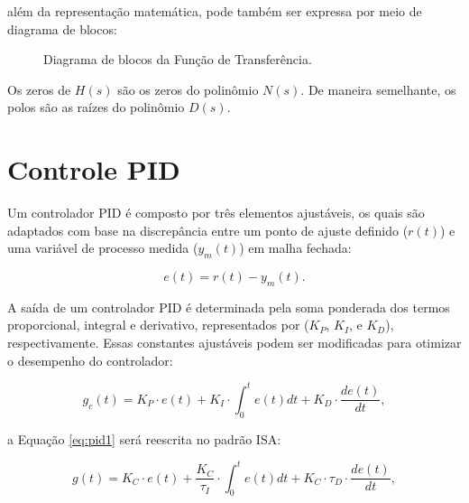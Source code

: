 \documentclass[12pt,           %
a4paper,                       %
openany,                       %
oneside,                       %
chapter=TITLE,                 %
english,                       %
spanish,                       %
brazil,                        %
sumario=tradicional]{abntex2}  %
\begin{document}
\begin{OnehalfSpace}
\noindent além da representação matemática, pode também ser expressa por meio de diagrama de blocos:

\begin{figure}[H] %
\vspace*{-0.3cm}
\centering
\caption{Diagrama de blocos da Função de Transferência.}
\label{fig:sys}
\end{figure}
\vspace*{-0.7cm}
{\raggedright {}}

Os zeros de $H(s)$ são os zeros do polinômio $N(s)$. De maneira semelhante, os polos são as raízes do polinômio $D(s)$.

\section{Controle PID}
\label{sec:Controle PID}

Um controlador PID é composto por três elementos ajustáveis, os quais são adaptados com base na discrepância entre um ponto de ajuste definido (\(r(t)\)) e uma variável de processo medida (\(y_m(t)\)) em malha fechada:

\begin{equation}
    \label{eq:erro}   %
        e(t) = r(t) - y_m(t).
\end{equation}

A saída de um controlador PID é determinada pela soma ponderada dos termos proporcional, integral e derivativo, representados por (\(K_P\), \(K_I\), e \(K_D\)), respectivamente. Essas constantes ajustáveis podem ser modificadas para otimizar o desempenho do controlador:

\begin{equation}
    \label{eq:pid1}
        g_c(t) = K_P \cdot e(t) + K_I\cdot \int_0^t e(t) dt + K_D \cdot \frac{de(t)}{dt},
\end{equation}

\noindent a Equação \ref{eq:pid1} será reescrita no padrão ISA:

\begin{equation}%
     \label{eq:pidisa}
        g(t) = K_C \cdot e(t) + \frac{K_C}{\tau_I}\cdot \int_0^t e(t) dt + K_C\cdot \tau_D \cdot \frac{de(t)}{dt},
\end{equation}


\end{OnehalfSpace}
\end{document}
